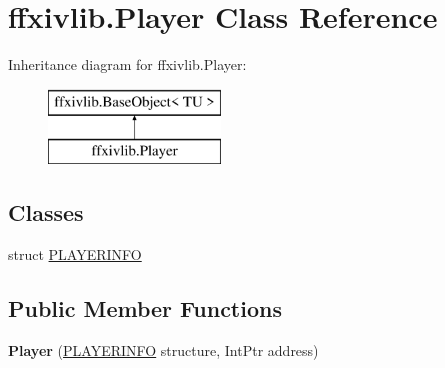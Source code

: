 \hypertarget{classffxivlib_1_1_player}{\section{ffxivlib.\-Player Class Reference}
\label{classffxivlib_1_1_player}
}
Inheritance diagram for ffxivlib.\-Player\-:\begin{figure}[H]
\begin{center}
\leavevmode
\includegraphics[height=2.000000cm]{classffxivlib_1_1_player}
\end{center}
\end{figure}
\subsection*{Classes}
\begin{DoxyCompactItemize}
\item 
struct \hyperlink{structffxivlib_1_1_player_1_1_p_l_a_y_e_r_i_n_f_o}{P\-L\-A\-Y\-E\-R\-I\-N\-F\-O}
\end{DoxyCompactItemize}
\subsection*{Public Member Functions}
\begin{DoxyCompactItemize}
\item 
\hypertarget{classffxivlib_1_1_player_a486640d935f478a0310238013c1199ef}{{\bfseries Player} (\hyperlink{structffxivlib_1_1_player_1_1_p_l_a_y_e_r_i_n_f_o}{P\-L\-A\-Y\-E\-R\-I\-N\-F\-O} structure, Int\-Ptr address)}\label{classffxivlib_1_1_player_a486640d935f478a0310238013c1199ef}

\end{DoxyCompactItemize}
